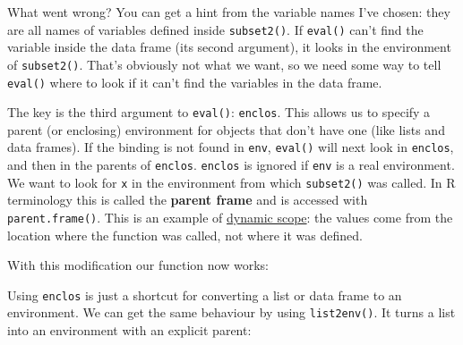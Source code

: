 What went wrong? You can get a hint from the variable names I've chosen:
they are all names of variables defined inside \texttt{subset2()}. If
\texttt{eval()} can't find the variable inside the data frame (its
second argument), it looks in the environment of \texttt{subset2()}.
That's obviously not what we want, so we need some way to tell
\texttt{eval()} where to look if it can't find the variables in the data
frame.

The key is the third argument to \texttt{eval()}: \texttt{enclos}. This
allows us to specify a parent (or enclosing) environment for objects
that don't have one (like lists and data frames). If the binding is not
found in \texttt{env}, \texttt{eval()} will next look in
\texttt{enclos}, and then in the parents of \texttt{enclos}.
\texttt{enclos} is ignored if \texttt{env} is a real environment. We
want to look for \texttt{x} in the environment from which
\texttt{subset2()} was called. In R terminology this is called the
\textbf{parent frame} and is accessed with \texttt{parent.frame()}. This
is an example of
\href{http://en.wikipedia.org/wiki/Scope_\%28programming\%29\#Dynamic_scoping}{dynamic
scope}: the values come from the location where the function was called,
not where it was defined. 

With this modification our function now works:

\begin{Shaded}
\begin{Highlighting}[]
\StringTok{ }
  \StringTok{ }
  \StringTok{ }\NormalTok{())}
\NormalTok{\}}

\StringTok{ }
\StringTok{ }
\end{Highlighting}
\end{Shaded}

Using \texttt{enclos} is just a shortcut for converting a list or data
frame to an environment. We can get the same behaviour by using
\texttt{list2env()}. It turns a list into an environment with an
explicit parent: 

\begin{Shaded}
\begin{Highlighting}[]
\StringTok{ }
  \StringTok{ }
  \StringTok{ } \NormalTok{())}
  \StringTok{ }
\NormalTok{\}}

\StringTok{ }
\StringTok{ }
\end{Highlighting}
\end{Shaded}

